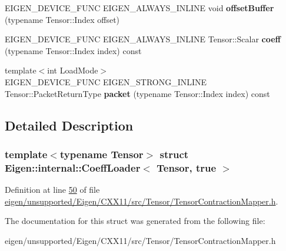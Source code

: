 \begin{DoxyCompactItemize}
\item 
\mbox{\label{struct_eigen_1_1internal_1_1_coeff_loader_3_01_tensor_00_01true_01_4_ae661b2ae71d66ef7fbe049fba545c873}} 
E\+I\+G\+E\+N\+\_\+\+D\+E\+V\+I\+C\+E\+\_\+\+F\+U\+NC E\+I\+G\+E\+N\+\_\+\+A\+L\+W\+A\+Y\+S\+\_\+\+I\+N\+L\+I\+NE void {\bfseries offset\+Buffer} (typename Tensor\+::\+Index offset)
\item 
\mbox{\label{struct_eigen_1_1internal_1_1_coeff_loader_3_01_tensor_00_01true_01_4_a2fd50cc8446af0bba6553a709d331d37}} 
E\+I\+G\+E\+N\+\_\+\+D\+E\+V\+I\+C\+E\+\_\+\+F\+U\+NC E\+I\+G\+E\+N\+\_\+\+A\+L\+W\+A\+Y\+S\+\_\+\+I\+N\+L\+I\+NE Tensor\+::\+Scalar {\bfseries coeff} (typename Tensor\+::\+Index index) const
\item 
\mbox{\label{struct_eigen_1_1internal_1_1_coeff_loader_3_01_tensor_00_01true_01_4_a1fe63149a6935cb39d3a054adc991de8}} 
{\footnotesize template$<$int Load\+Mode$>$ }\\E\+I\+G\+E\+N\+\_\+\+D\+E\+V\+I\+C\+E\+\_\+\+F\+U\+NC E\+I\+G\+E\+N\+\_\+\+S\+T\+R\+O\+N\+G\+\_\+\+I\+N\+L\+I\+NE Tensor\+::\+Packet\+Return\+Type {\bfseries packet} (typename Tensor\+::\+Index index) const
\end{DoxyCompactItemize}


\subsection{Detailed Description}
\subsubsection*{template$<$typename Tensor$>$\newline
struct Eigen\+::internal\+::\+Coeff\+Loader$<$ Tensor, true $>$}



Definition at line \hyperlink{eigen_2unsupported_2_eigen_2_c_x_x11_2src_2_tensor_2_tensor_contraction_mapper_8h_source_l00050}{50} of file \hyperlink{eigen_2unsupported_2_eigen_2_c_x_x11_2src_2_tensor_2_tensor_contraction_mapper_8h_source}{eigen/unsupported/\+Eigen/\+C\+X\+X11/src/\+Tensor/\+Tensor\+Contraction\+Mapper.\+h}.



The documentation for this struct was generated from the following file\+:\begin{DoxyCompactItemize}
\item 
eigen/unsupported/\+Eigen/\+C\+X\+X11/src/\+Tensor/\+Tensor\+Contraction\+Mapper.\+h\end{DoxyCompactItemize}
